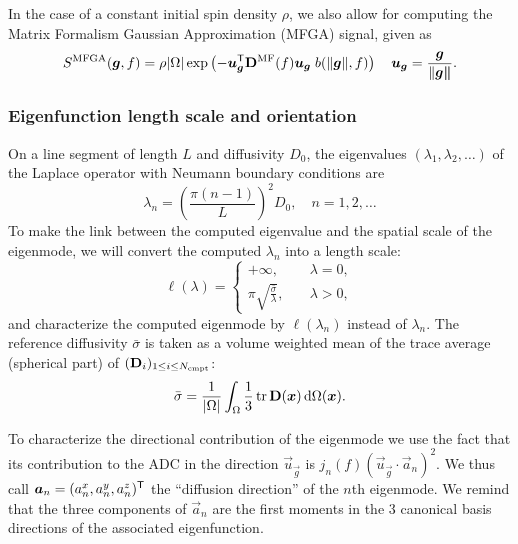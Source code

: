 \documentclass[a4paper]{article}
\begin{document}
In the case of a constant initial spin density $\rho$, we also allow for computing the Matrix Formalism Gaussian Approximation (MFGA) signal, given as
\begin{equation}\label{eq:sig_mfga}
    S^{\text{MFGA}}(\bm{g},f) = \rho|\Omega| \exp\left(-\bm{u}_{\bm{g}}^{\mathsf{T}} \mathbf{D}^{\text{MF}}(f)\bm{u}_{\bm{g}} \; b(\|\bm{g}\|,f)\right) \quad \bm{u}_{\bm{g}} = \frac{\bm{g}}{\|\bm{g\|}}.
\end{equation}



\subsubsection{Eigenfunction length scale and orientation}

On a line segment of length $L$ and diffusivity $D_0$, the eigenvalues $(\lambda_1, \lambda_2, \dots)$ of the Laplace operator with Neumann boundary conditions are
\begin{equation}
    \lambda_n = \left(\frac{\pi (n - 1)}{L}\right)^2 D_0, \quad n = 1, 2, \dots
\end{equation}
To make the link between the computed eigenvalue and the spatial scale of the eigenmode, we will convert the computed $\lambda_n$ into a length scale:
\begin{equation} \label{eq:lap_eig_lscale}
    \ell(\lambda) =
    \begin{cases}
        + \infty, \quad                                & \lambda = 0, \\
        \pi \sqrt{\frac{\bar{\sigma}}{\lambda}}, \quad & \lambda > 0,
    \end{cases}
\end{equation}
and characterize the computed eigenmode by $\ell(\lambda_n)$ instead of $\lambda_n$. The reference diffusivity $\bar{\sigma}$ is taken as a volume weighted mean of the trace average (spherical part) of $(\mathbf{D}_i)_{1 \leq i \leq N_\text{cmpt}}$:
\begin{equation}
    \bar{\sigma} = \frac{1}{|\Omega|} \int_\Omega \frac{1}{3}\operatorname{tr} \mathbf{D}(\bm{x}) \, \mathrm{d} \Omega(\bm{x}).
\end{equation}

To characterize the directional contribution of the eigenmode we use the fact that its contribution to the ADC in the direction $\vec{u}_{\vec{g}}$ is $j_n(f) (\vec{u}_{\vec{g}} \cdot \vec{a}_n)^2$. We thus call $\bm{a}_n = (a_n^x, a_n^y, a_n^z)^{\mathsf{T}}$ the ``diffusion direction'' of the $n$th eigenmode. We remind that the three components of $\vec{a}_n$ are the first moments in the 3 canonical basis directions of the associated eigenfunction.
\end{document}
